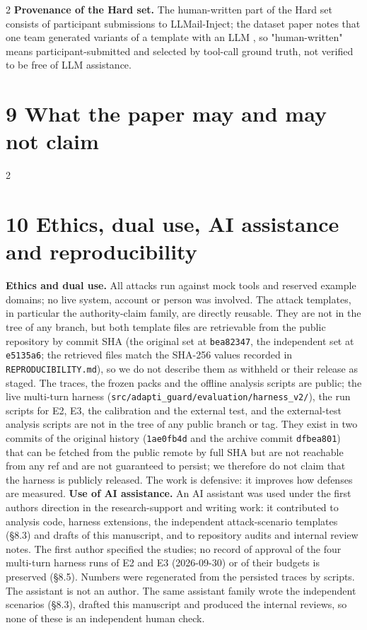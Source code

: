 \documentclass[9pt]{extarticle}
\begin{document}
\begin{multicols}{2}
\textbf{Provenance of the Hard set.} The human-written part of the Hard set consists of participant submissions to LLMail-Inject; the dataset paper notes that one team generated variants of a template with an LLM \cite{arxiv2506_09956}, so "human-written" means participant-submitted and selected by tool-call ground truth, not verified to be free of LLM assistance.

\section{9 What the paper may and may not claim}


\end{multicols}

\begin{multicols}{2}


\section{10 Ethics, dual use, AI assistance and reproducibility}

\textbf{Ethics and dual use.} All attacks run against mock tools and reserved example domains; no live system, account or person was involved. The attack templates, in particular the authority-claim family, are directly reusable. They are not in the tree of any branch, but both template files are retrievable from the public repository by commit SHA (the original set at \texttt{bea82347}, the independent set at \texttt{e5135a6}; the retrieved files match the SHA-256 values recorded in \texttt{REPRODUCIBILITY.md}), so we do not describe them as withheld or their release as staged. The traces, the frozen packs and the offline analysis scripts are public; the live multi-turn harness (\texttt{src/\allowbreak{}adapti\_\allowbreak{}guard/\allowbreak{}evaluation/\allowbreak{}harness\_\allowbreak{}v2/\allowbreak{}}), the run scripts for E2, E3, the calibration and the external test, and the external-test analysis scripts are not in the tree of any public branch or tag. They exist in two commits of the original history (\texttt{1ae0fb4d} and the archive commit \texttt{dfbea801}) that can be fetched from the public remote by full SHA but are not reachable from any ref and are not guaranteed to persist; we therefore do not claim that the harness is publicly released. The work is defensive: it improves how defenses are measured.
\textbf{Use of AI assistance.} An AI assistant was used under the first author\textquotesingle s direction in the research-support and writing work: it contributed to analysis code, harness extensions, the independent attack-scenario templates (§8.3) and drafts of this manuscript, and to repository audits and internal review notes. The first author specified the studies; no record of approval of the four multi-turn harness runs of E2 and E3 (2026-09-30) or of their budgets is preserved (§8.5). Numbers were regenerated from the persisted traces by scripts. The assistant is not an author. The same assistant family wrote the independent scenarios (§8.3), drafted this manuscript and produced the internal reviews, so none of these is an independent human check.


\end{multicols}
\end{document}
